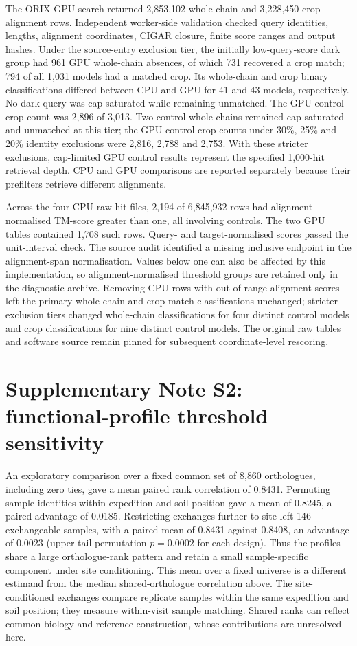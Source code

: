 \documentclass[11pt]{article}
\begin{document}
The ORIX GPU search returned 2{,}853{,}102 whole-chain and 3{,}228{,}450 crop alignment rows.
Independent worker-side validation checked query identities, lengths, alignment coordinates,
CIGAR closure, finite score ranges and output hashes. Under the source-entry exclusion tier,
the initially low-query-score dark group had 961 GPU whole-chain absences, of which 731
recovered a crop match; 794 of all 1{,}031 models had a matched crop. Its whole-chain and crop
binary classifications differed between CPU and GPU for 41 and 43 models, respectively.
No dark query was cap-saturated while remaining unmatched. The GPU control crop count was
2{,}896 of 3{,}013. Two control whole chains remained cap-saturated and unmatched at this tier;
the GPU control crop counts under 30\%, 25\% and 20\% identity exclusions were 2{,}816,
2{,}788 and 2{,}753. With these stricter exclusions, cap-limited GPU control results represent the specified
1{,}000-hit retrieval depth. CPU and GPU comparisons are reported separately because their
prefilters retrieve different alignments.

Across the four CPU raw-hit files, 2{,}194 of 6{,}845{,}932 rows had alignment-normalised
TM-score greater than one, all involving controls. The two GPU tables contained 1{,}708 such
rows. Query- and target-normalised scores passed the unit-interval check. The source audit
identified a missing inclusive endpoint in the alignment-span normalisation. Values below one
can also be affected by this implementation, so alignment-normalised threshold groups are
retained only in the diagnostic archive. Removing CPU rows with out-of-range alignment scores
left the primary whole-chain and crop match classifications unchanged; stricter exclusion tiers
changed whole-chain classifications for four distinct control models and crop classifications
for nine distinct control models. The original raw tables and
software source remain pinned for subsequent coordinate-level rescoring.

\section*{Supplementary Note S2: functional-profile threshold sensitivity}

An exploratory comparison over a fixed common set of 8{,}860 orthologues, including zero ties, gave a mean paired rank correlation of 0.8431. Permuting sample identities within expedition and soil position gave a mean of 0.8245, a paired advantage of 0.0185. Restricting exchanges further to site left 146 exchangeable samples, with a paired mean of 0.8431 against 0.8408, an advantage of 0.0023 (upper-tail permutation $p = 0.0002$ for each design). Thus the profiles share a large orthologue-rank pattern and retain a small sample-specific component under site conditioning. This mean over a fixed universe is a different estimand from the median shared-orthologue correlation above. The site-conditioned exchanges compare replicate samples within the same expedition and soil position; they measure within-visit sample matching. Shared ranks can reflect common biology and reference construction, whose contributions are unresolved here.
\end{document}

